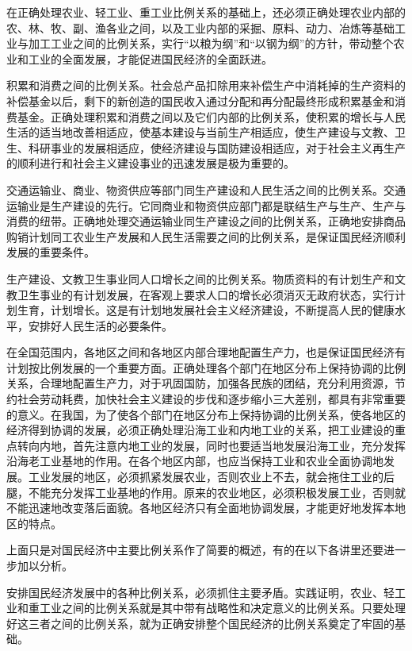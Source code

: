 \documentclass{book}
\begin{document}
在正确处理农业、轻工业、重工业比例关系的基础上，还必须正确处理农业内部的农、林、牧、副、渔各业之间，以及工业内部的采掘、原料、动力、冶炼等基础工业与加工工业之间的比例关系，实行“以粮为纲”和“以钢为纲”的方针，带动整个农业和工业的全面发展，才能促进国民经济的全面跃进。

积累和消费之间的比例关系。社会总产品扣除用来补偿生产中消耗掉的生产资料的补偿基金以后，剩下的新创造的国民收入通过分配和再分配最终形成积累基金和消费基金。正确处理积累和消费之间以及它们内部的比例关系，使积累的增长与人民生活的适当地改善相适应，使基本建设与当前生产相适应，使生产建设与文教、卫生、科研事业的发展相适应，使经济建设与国防建设相适应，对于社会主义再生产的顺利进行和社会主义建设事业的迅速发展是极为重要的。

交通运输业、商业、物资供应等部门同生产建设和人民生活之间的比例关系。交通运输业是生产建设的先行。它同商业和物资供应部门都是联结生产与生产、生产与消费的纽带。正确地处理交通运输业同生产建设之间的比例关系，正确地安排商品购销计划同工农业生产发展和人民生活需要之间的比例关系，是保证国民经济顺利发展的重要条件。

生产建设、文教卫生事业同人口增长之间的比例关系。物质资料的有计划生产和文教卫生事业的有计划发展，在客观上要求人口的增长必须消灭无政府状态，实行计划生育，计划增长。这是有计划地发展社会主义经济建设，不断提高人民的健康水平，安排好人民生活的必要条件。

在全国范围内，各地区之间和各地区内部合理地配置生产力，也是保证国民经济有计划按比例发展的一个重要方面。正确处理各个部门在地区分布上保持协调的比例关系，合理地配置生产力，对于巩固国防，加强各民族的团结，充分利用资源，节约社会劳动耗费，加快社会主义建设的步伐和逐步缩小三大差别，都具有非常重要的意义。在我国，为了使各个部门在地区分布上保持协调的比例关系，使各地区的经济得到协调的发展，必须正确处理沿海工业和内地工业的关系，把工业建设的重点转向内地，首先注意内地工业的发展，同时也要适当地发展沿海工业，充分发挥沿海老工业基地的作用。在各个地区内部，也应当保持工业和农业全面协调地发展。工业发展的地区，必须抓紧发展农业，否则农业上不去，就会拖住工业的后腿，不能充分发挥工业基地的作用。原来的农业地区，必须积极发展工业，否则就不能迅速地改变落后面貌。各地区经济只有全面地协调发展，才能更好地发挥本地区的特点。

上面只是对国民经济中主要比例关系作了简要的概述，有的在以下各讲里还要进一步加以分析。

安排国民经济发展中的各种比例关系，必须抓住主要矛盾。实践证明，农业、轻工业和重工业之间的比例关系就是其中带有战略性和决定意义的比例关系。只要处理好这三者之间的比例关系，就为正确安排整个国民经济的比例关系奠定了牢固的基础。
\end{document}
